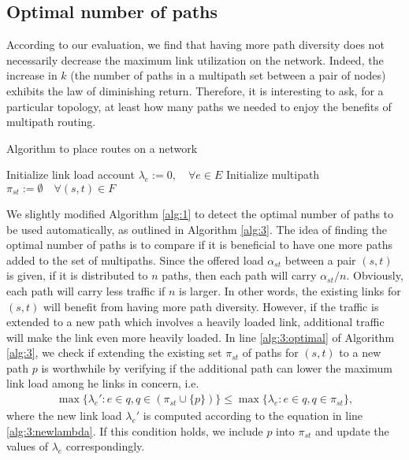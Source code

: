 \documentclass[conference]{IEEEtran}
\begin{document}
\subsection{Optimal number of paths}\label{sub:optimalk}

According to our evaluation, we find that having more path diversity does not
necessarily decrease the maximum link utilization on the network. Indeed, the
increase in $k$ (the number of paths in a multipath set between a pair of
nodes) exhibits the law of diminishing return. Therefore, it is interesting to
ask, for a particular topology, at least how many paths we needed to enjoy the
benefits of multipath routing.

\begin{algorithm}
\caption{Algorithm to place routes on a network}\label{alg:3}
Initialize link load account $\lambda_e :=0,\quad\forall e\in E$\;
Initialize multipath $\pi_{st}:=\emptyset\quad\forall (s,t)\in F$\;
\end{algorithm}

We slightly modified Algorithm \ref{alg:1} to detect the optimal number of
paths to be used automatically, as outlined in Algorithm \ref{alg:3}. The idea
of finding the optimal number of paths is to compare if it is beneficial to
have one more paths added to the set of multipaths. Since the offered load
$\alpha_{st}$ between a pair $(s,t)$ is given, if it is distributed to $n$
paths, then each path will carry $\alpha_{st}/n$. Obviously, each path will
carry less traffic if $n$ is larger. In other words, the existing links for
$(s,t)$ will benefit from having more path diversity. However, if the traffic
is extended to a new path which involves a heavily loaded link, additional
traffic will make the link even more heavily loaded. In line
\ref{alg:3:optimal} of Algorithm \ref{alg:3}, we check if extending the
existing set $\pi_{st}$ of paths for $(s,t)$ to a new path $p$ is worthwhile by
verifying if the additional path can lower the maximum link load among he
links in concern, i.e.
\begin{align*}
\max \{\lambda_e': e\in q, q\in(\pi_{st}\cup\{p\})\} \le \max \{\lambda_e:e\in q, q\in\pi_{st}\},
\end{align*}
where the new link load $\lambda_e'$ is computed according to the equation in
line \ref{alg:3:newlambda}. If this condition holds, we include $p$ into
$\pi_{st}$ and update the values of $\lambda_e$ correspondingly.
\end{document}

